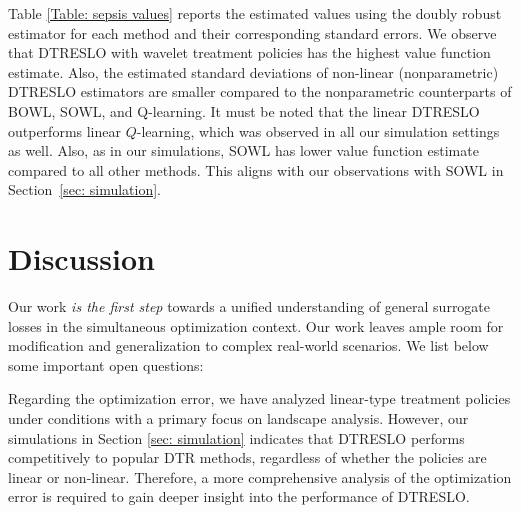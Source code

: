 \documentclass[preprint] {imsart}
\begin{document}
Table \ref{Table: sepsis values} reports the estimated values using the doubly robust estimator for each method and their corresponding standard errors. 
We observe that DTRESLO with wavelet treatment policies has the highest value function estimate. Also, the estimated standard deviations of non-linear (nonparametric) DTRESLO estimators are smaller compared to the nonparametric counterparts of BOWL, SOWL, and Q-learning.
It must be noted that the linear DTRESLO outperforms linear $Q$-learning, which was  observed in all our simulation settings as well.
Also, as in our simulations,
SOWL has lower value function estimate compared to all other methods. This aligns with our observations with SOWL in Section~\ref{sec: simulation}.


  
  \section{Discussion}
  \label{sec: discussion}
 {\color{black}  Our work\label{page: first step} \emph{is the first step} towards a unified understanding of general surrogate losses in the simultaneous optimization  context.} Our work leaves ample room for  modification and generalization to complex real-world scenarios. We list below some important open questions:


{\color{black} \label{page: open problem} 
Regarding the optimization error, we have analyzed linear-type treatment policies under conditions with a primary focus on  landscape analysis.  However, our simulations in Section \ref{sec: simulation} indicates that DTRESLO performs competitively to popular  DTR methods, regardless of whether the policies are linear or non-linear. Therefore,  a more comprehensive analysis of the optimization error is required to gain deeper insight into the performance of   DTRESLO.}
\end{document}
